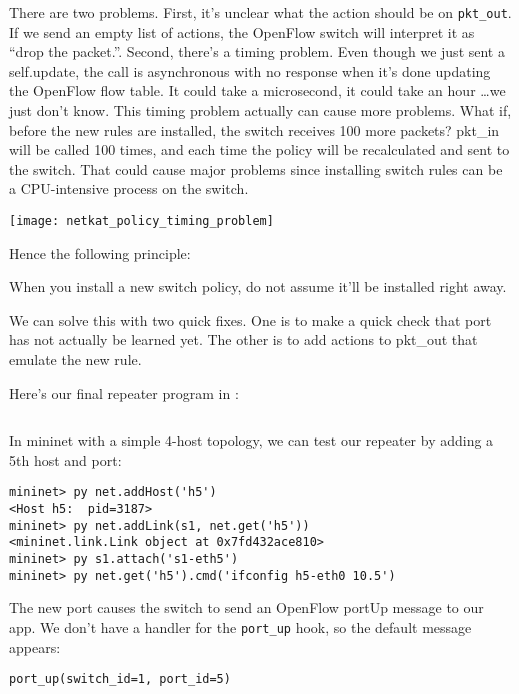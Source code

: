 There are two problems.  First, it's unclear what the action should be on \texttt{pkt\_out}.  If we send an empty 
list of actions, the OpenFlow switch will interpret it as ``drop the packet.''.  
Second, there's a timing problem.
Even though we just sent a self.update, the call is asynchronous with no response when it's done updating the
OpenFlow flow table.  It could take a microsecond, it could take an hour \ldots we just don't know.  
This timing problem actually can cause more problems.  What if, before the new rules are installed, the 
switch receives 100 more packets?  pkt\_in will be called 100 times, and each time the policy will
be recalculated and sent to the switch.  That could cause major problems since installing switch rules can
be a CPU-intensive process on the switch.

\texttt{[image: netkat\_policy\_timing\_problem]}

Hence the following principle:

\begin{principle}
When you install a new switch policy, do not assume it'll be installed right away.  
\end{principle}

We can solve this with two quick fixes.  One is to make a quick check that port has not actually be learned yet.
The other is to add actions to pkt\_out that emulate the new rule.  

Here's our final repeater program in :

\inputminted{python}{code/netkat_principles/repeater5.py}

In mininet with a simple 4-host topology, we can test our repeater by adding a 5th host and port:

\begin{verbatim}
mininet> py net.addHost('h5')
<Host h5:  pid=3187>
mininet> py net.addLink(s1, net.get('h5'))
<mininet.link.Link object at 0x7fd432ace810>
mininet> py s1.attach('s1-eth5')
mininet> py net.get('h5').cmd('ifconfig h5-eth0 10.5')
\end{verbatim}

The new port causes the switch to send an OpenFlow portUp message to our app.  We don't have a handler for
the \texttt{port\_up} hook, so the default message appears:

\begin{verbatim}
port_up(switch_id=1, port_id=5)
\end{verbatim}

